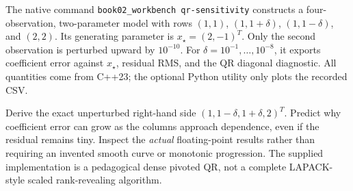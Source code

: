 \begin{booktwolab}
The native command \texttt{book02\_workbench qr-sensitivity}
constructs a four-observation, two-parameter model with
rows \((1,1)\), \((1,1+\delta)\), \((1,1-\delta)\), and \((2,2)\).
Its generating parameter is \(x_\star=(2,-1)^T\).
Only the second observation is perturbed upward by \(10^{-10}\).
For \(\delta=10^{-1},\ldots,10^{-8}\), it exports
coefficient error against \(x_\star\), residual RMS, and the
QR diagonal diagnostic. All quantities come from C++23;
the optional Python utility only plots the recorded CSV.

Derive the exact unperturbed right-hand side
\((1,1-\delta,1+\delta,2)^T\). Predict why coefficient
error can grow as the columns approach dependence, even if
the residual remains tiny. Inspect the \emph{actual}
floating-point results rather than requiring an invented
smooth curve or monotonic progression. The supplied
implementation is a pedagogical dense pivoted QR,
not a complete LAPACK-style scaled rank-revealing algorithm.
\end{booktwolab}
